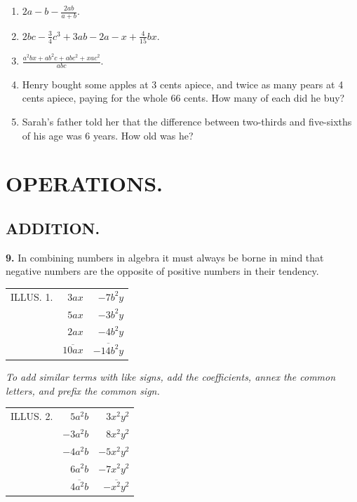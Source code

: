 \documentclass{book}
\begin{document}
\begin{enumerate}
\item $2a - b - \frac{2ab}{a + b}$.

\item $2bc - \frac{3}{4}c^3 + 3ab - 2a - x + \frac{4}{15}bx$.

\item $\frac{a^2bx + ab^2c + abc^2 + xac^2}{abc}$.

\item Henry bought some apples at 3 cents apiece, and twice as
many pears at 4 cents apiece, paying for the whole 66 cents. How
many of each did he buy?

\item Sarah's father told her that the difference between
two-thirds and five-sixths of his age was 6 years. How old was he?
\end{enumerate}

\chapter*{OPERATIONS.}

\section*{ADDITION.}

\textbf{ 9.} In combining numbers in algebra it must always be
borne in mind that negative numbers are the opposite of positive
numbers in their tendency.

\begin{tabular}{l r r}

ILLUS. 1.&$3ax$&$-7b^2y$\\
&$5ax$&$-3b^2y$\\
&$2ax$&$-4b^2y$\\
&$\overline{10ax}$&$\overline{-14b^2y}$
\end{tabular}

\textit{ To add similar terms with like signs, add the
coefficients, annex the common letters, and prefix the common
sign.}

\begin{tabular}{l r r}

ILLUS. 2.&$5a^2b$&$3x^2y^2$\\
&$-3a^2b$&$8x^2y^2$\\
&$-4a^2b$&$-5x^2y^2$\\
&$6a^2b$&$-7x^2y^2$\\
&$\overline{4a^2b}$&$\overline{-x^2y^2}$

\end{tabular}
\end{document}
